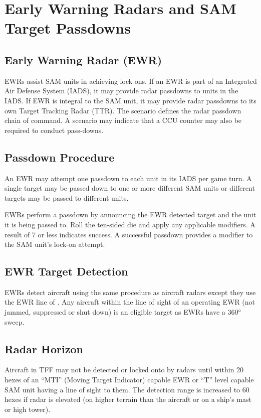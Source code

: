 \section{Early Warning Radars and SAM Target Passdowns}



\subsection{Early Warning Radar (EWR)} EWRs assist SAM units in achieving lock-ons. If an EWR is part of an Integrated Air Defense System (IADS), it may provide radar passdowns to units in the IADS. If EWR is integral to the SAM unit, it may provide radar passdowns to its own Target Tracking Radar (TTR). The scenario defines the radar passdown chain of command. A scenario may indicate that a CCU counter may also be required to conduct pass-downs.

\subsection{Passdown Procedure} An EWR may attempt one passdown to each unit in its IADS per game turn. A single target may be passed down to one or more different SAM units or different targets may be passed to different units.

EWRs perform a passdown by announcing the EWR detected target and the unit it is being passed to. Roll the ten-sided die and apply any applicable modifiers. A result of 7 or less indicates success. A successful passdown provides a  modifier to the SAM unit's lock-on attempt.

\subsection{EWR Target Detection}  EWRs detect aircraft using the same procedure as aircraft radars except they use the EWR line of . Any aircraft within the line of sight of an operating EWR (not jammed, suppressed or shut down) is an eligible target as EWRs have a 360° sweep.

\subsection{Radar Horizon} Aircraft in TFF may not be detected or locked onto by radars until within 20 hexes of an “MTI” (Moving Target Indicator) capable EWR or “T” level capable SAM unit having a line of sight to them. The detection range is increased to 60 hexes if radar is elevated (on higher terrain than the aircraft or on a ship’s mast or high tower).

